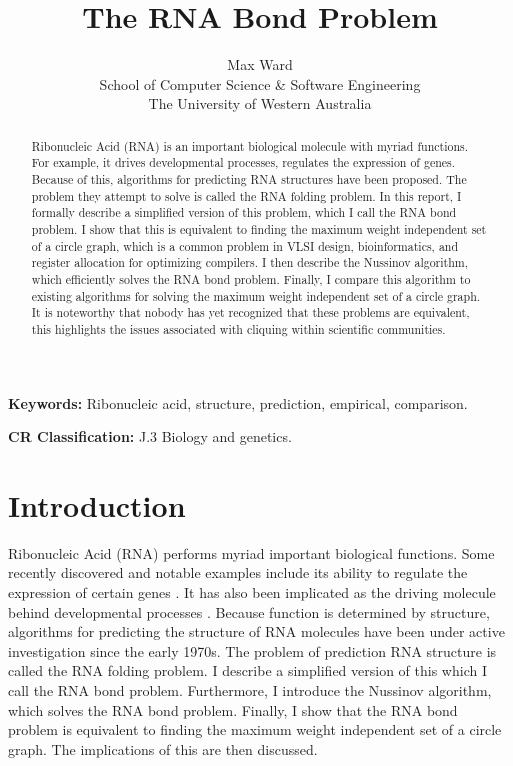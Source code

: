 \documentclass[12pt, a4paper]{article}
\title{The RNA Bond Problem}
\author{Max Ward \\
School of Computer Science \& Software Engineering \\
The University of Western Australia}
\begin{document}
\maketitle

\begin{abstract}
Ribonucleic Acid (RNA) is an important biological molecule with myriad functions. For example, it drives developmental processes, regulates the expression of genes. Because of this, algorithms for predicting RNA structures have been proposed. The problem they attempt to solve is called the RNA folding problem. In this report, I formally describe a simplified version of this problem, which I call the RNA bond problem. I show that this is equivalent to finding the maximum weight independent set of a circle graph, which is a common problem in VLSI design, bioinformatics, and register allocation for optimizing compilers. I then describe the Nussinov algorithm, which efficiently solves the RNA bond problem. Finally, I compare this algorithm to existing algorithms for solving the maximum weight independent set of a circle graph. It is noteworthy that nobody has yet recognized that these problems are equivalent, this highlights the issues associated with cliquing within scientific communities.
\end{abstract}


{\bf Keywords:} Ribonucleic acid, structure, prediction, empirical, comparison.

{\bf CR Classification:} J.3 Biology and genetics.

\clearpage


\section{Introduction}
Ribonucleic Acid (RNA) performs myriad important biological functions. Some recently discovered and notable examples include its ability to regulate the expression of certain genes \cite{mattick2007new}. It has also been implicated as the driving molecule behind developmental processes \cite{mattick2007new}. Because function is determined by structure, algorithms for predicting the structure of RNA molecules have been under active investigation since the early 1970s. The problem of prediction RNA structure is called the RNA folding problem. I describe a simplified version of this which I call the RNA bond problem. Furthermore, I introduce the Nussinov algorithm, which solves the RNA bond problem. Finally, I show that the RNA bond problem is equivalent to finding the maximum weight independent set of a circle graph. The implications of this are then discussed.
\end{document}
